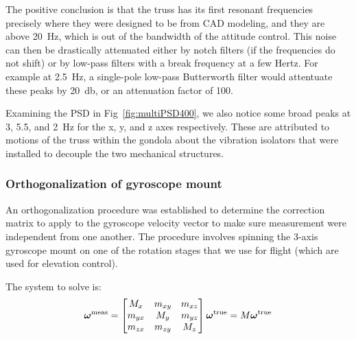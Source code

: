 The positive conclusion is that the truss has its first resonant frequencies precisely where they were designed to be from CAD modeling, and they are above \SI{20}{\hertz}, which is out of the bandwidth of the attitude control. This noise can then be drastically attenuated either by notch filters (if the frequencies do not shift) or by low-pass filters with a break frequency at a few Hertz. For example at \SI{2.5}{\hertz}, a single-pole low-pass Butterworth filter would attentuate these peaks by \SI{20}{\decibel}, or an attenuation factor of 100. 

Examining the PSD in Fig~\ref{fig:multiPSD400}, we also notice some broad peaks at 3, 5.5, and \SI{2}{\hertz} for the x, y, and z axes respectively. These are attributed to motions of the truss within the gondola about the vibration isolators that were installed to decouple the two mechanical structures. 




\subsubsection{Orthogonalization of gyroscope mount}
\label{ap:gyroOrth}

An orthogonalization procedure was established to determine the correction matrix to apply to the gyroscope velocity vector to make sure measurement were independent from one another. The procedure involves spinning the 3-axis gyroscope mount on one of the rotation stages that we use for flight (which are used for elevation control). 

The system to solve is:
\begin{equation}
\boldsymbol\omega^\textrm{meas} = \begin{bmatrix} M_x & m_{xy} & m_{xz} \\   m_{yx} & M_y &m_{yz} \\  m_{zx} & m_{zy} & M_z \end{bmatrix} \boldsymbol\omega^\textrm{true} = M \boldsymbol\omega^\textrm{true} 
\end{equation}

